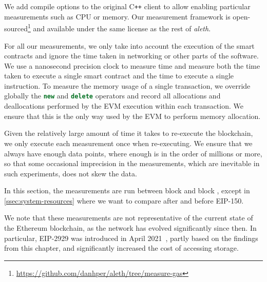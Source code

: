 We add compile options to the original C\texttt{++} client to allow enabling particular measurements such as CPU or memory. Our measurement framework is open-sourced\footnote{\url{https://github.com/danhper/aleth/tree/measure-gas}} and available under the same license as the rest of \textit{aleth}.

For all our measurements, we only take into account the execution of the smart contracts and ignore the time taken in networking or other parts of the software. We use a nanosecond precision clock to measure time and measure both the time taken to execute a single smart contract and the time to execute a single instruction. To measure the memory usage of a single transaction, we override globally the \lstinline[language=C++]{new} and \lstinline[language=C++]{delete} operators and record all allocations and deallocations performed by the EVM execution within each transaction. We ensure that this is the only way used by the EVM to perform memory allocation.

Given the relatively large amount of time it takes to re-execute the blockchain, we only execute each measurement once when re-executing. We ensure that we always have enough data points, where enough is in the order of millions or more, so that some occasional imprecision in the measurements, which are inevitable in such experiments, does not skew the data.

In this section, the measurements are run between block  and block , except in \autoref{ssec:system-resources} where we want to compare after and before EIP-150.

We note that these measurements are not representative of the current state of the Ethereum blockchain, as the network has evolved significantly since then.
In particular, EIP-2929 was introduced in April 2021~\cite{eip-2929}, partly based on the findings from this chapter, and significantly increased the cost of accessing storage.

